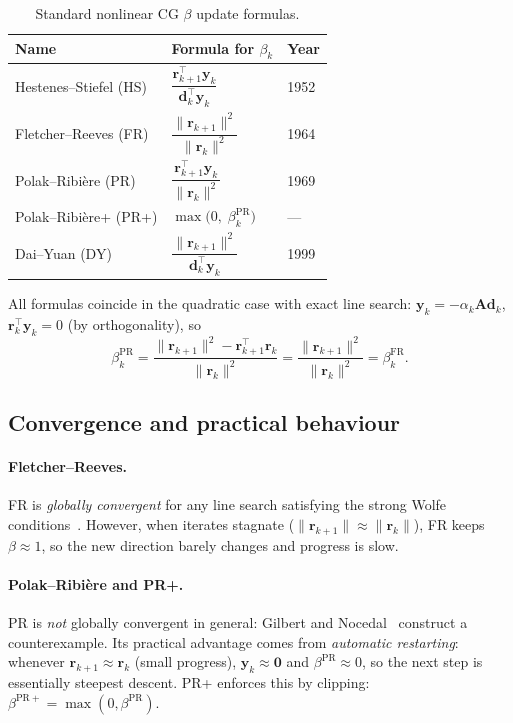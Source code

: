 \documentclass[11pt,a4paper]{article}
\newcommand{\bA}{\mathbf{A}}
\newcommand{\br}{\mathbf{r}}
\newcommand{\bd}{\mathbf{d}}
\newcommand{\by}{\mathbf{y}}
\newcommand{\bzero}{\mathbf{0}}
\newcommand{\norm}[1]{\|#1\|}
\newcommand{\tr}{\top}
\begin{document}
\begin{table}[ht]
\centering
\caption{Standard nonlinear CG $\beta$ update formulas.}
\label{tab:beta}
\begin{tabular}{@{}lll@{}}
\toprule
Name & Formula for $\beta_k$ & Year \\
\midrule
Hestenes--Stiefel (HS)  & $\dfrac{\br_{k+1}^\tr \by_k}{\bd_k^\tr \by_k}$ & 1952 \\[8pt]
Fletcher--Reeves (FR)   & $\dfrac{\norm{\br_{k+1}}^2}{\norm{\br_k}^2}$ & 1964 \\[8pt]
Polak--Ribi\`ere (PR)   & $\dfrac{\br_{k+1}^\tr \by_k}{\norm{\br_k}^2}$ & 1969 \\[8pt]
Polak--Ribi\`ere+ (PR+) & $\max\!\bigl(0,\;\beta_k^{\mathrm{PR}}\bigr)$ & --- \\[8pt]
Dai--Yuan (DY)          & $\dfrac{\norm{\br_{k+1}}^2}{\bd_k^\tr \by_k}$ & 1999 \\
\bottomrule
\end{tabular}
\end{table}

\noindent
All formulas coincide in the quadratic case with exact line search:
$\by_k = -\alpha_k\bA\bd_k$, $\br_k^\tr\by_k = 0$ (by orthogonality), so
\[
  \beta_k^{\mathrm{PR}} = \frac{\norm{\br_{k+1}}^2 - \br_{k+1}^\tr\br_k}{\norm{\br_k}^2}
  = \frac{\norm{\br_{k+1}}^2}{\norm{\br_k}^2} = \beta_k^{\mathrm{FR}}.
\]

\subsection{Convergence and practical behaviour}

\paragraph{Fletcher--Reeves.}
FR is \emph{globally convergent} for any line search satisfying the strong
Wolfe conditions~\cite{AlBaali1985,Zoutendijk1970}.  However, when iterates
stagnate ($\norm{\br_{k+1}} \approx \norm{\br_k}$), FR keeps $\beta \approx 1$,
so the new direction barely changes and progress is slow.

\paragraph{Polak--Ribi\`ere and PR+.}
PR is \emph{not} globally convergent in general:
Gilbert and Nocedal~\cite{GilNoc1992} construct a counterexample.
Its practical advantage comes from \emph{automatic restarting}: whenever
$\br_{k+1} \approx \br_k$ (small progress), $\by_k \approx \bzero$ and
$\beta^{\mathrm{PR}} \approx 0$, so the next step is essentially steepest descent.
PR+ enforces this by clipping: $\beta^{\mathrm{PR+}} = \max(0, \beta^{\mathrm{PR}})$.
\end{document}
